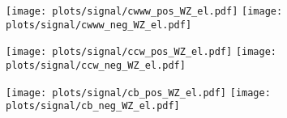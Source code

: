 \begin{figure}
	\centering
	\begin{subfigure}{\textwidth}
		\texttt{[image: plots/signal/cwww\_pos\_WZ\_el.pdf]}
		\texttt{[image: plots/signal/cwww\_neg\_WZ\_el.pdf]}
		\caption{}
	\end{subfigure}
	\begin{subfigure}{\textwidth}
		\texttt{[image: plots/signal/ccw\_pos\_WZ\_el.pdf]}
		\texttt{[image: plots/signal/ccw\_neg\_WZ\_el.pdf]}
		\caption{}
	\end{subfigure}
	\begin{subfigure}{\textwidth}
		\texttt{[image: plots/signal/cb\_pos\_WZ\_el.pdf]}
		\texttt{[image: plots/signal/cb\_neg\_WZ\_el.pdf]}
		\caption{}
	\end{subfigure}
	\caption[Fit result for the quadratic aTGC contribution in the WZ-category, electron channel]{}
	\label{fig:signal:WZ_el_sig}
\end{figure}
